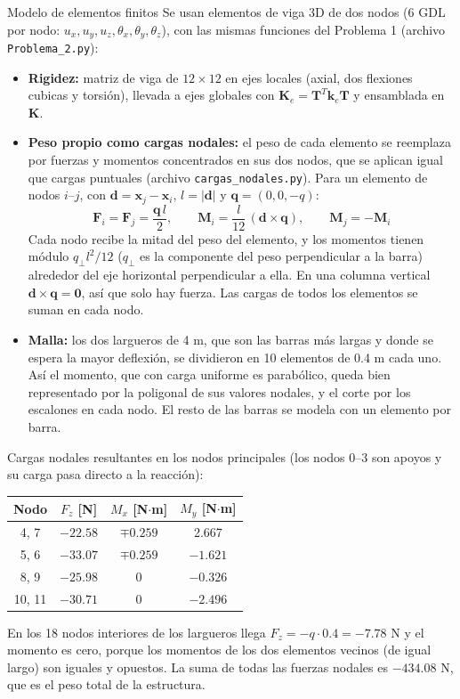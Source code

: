 \begin{desarrollo}{Modelo de elementos finitos}
Se usan elementos de viga 3D de dos nodos (6 GDL por nodo:
$u_x,u_y,u_z,\theta_x,\theta_y,\theta_z$), con las mismas funciones del
Problema 1 (archivo \texttt{Problema\_2.py}):
\begin{itemize}[itemsep=2pt]
    \item \textbf{Rigidez:} matriz de viga de $12\times12$ en ejes locales
    (axial, dos flexiones cubicas y torsión), llevada a ejes globales con
    $\mathbf{K}_e=\mathbf{T}^T\mathbf{k}_e\mathbf{T}$ y ensamblada en
    $\mathbf{K}$.
    \item \textbf{Peso propio como cargas nodales:} el peso de cada elemento
    se reemplaza por fuerzas y momentos concentrados en sus dos nodos, que se
    aplican igual que cargas puntuales (archivo \texttt{cargas\_nodales.py}).
    Para un elemento de nodos $i$--$j$, con $\mathbf{d}=\mathbf{x}_j-\mathbf{x}_i$,
    $l=|\mathbf{d}|$ y $\mathbf{q}=(0,0,-q)$:
    $$\mathbf{F}_i=\mathbf{F}_j=\frac{\mathbf{q}\,l}{2},\qquad
    \mathbf{M}_i=\frac{l}{12}\,(\mathbf{d}\times\mathbf{q}),\qquad
    \mathbf{M}_j=-\mathbf{M}_i$$
    Cada nodo recibe la mitad del peso del elemento, y los momentos tienen
    módulo $q_\perp l^2/12$ ($q_\perp$ es la componente del peso perpendicular
    a la barra) alrededor del eje horizontal perpendicular a ella. En una
    columna vertical $\mathbf{d}\times\mathbf{q}=\mathbf{0}$, así que solo hay
    fuerza. Las cargas de todos los elementos se suman en cada nodo.
    \item \textbf{Malla:} los dos largueros de 4 m, que son las barras más
    largas y donde se espera la mayor deflexión, se dividieron en 10 elementos
    de 0.4 m cada uno. Así el momento, que con carga uniforme es parabólico,
    queda bien representado por la poligonal de sus valores nodales, y el corte
    por los escalones en cada nodo. El resto de las barras se modela con un
    elemento por barra.
    
\end{itemize}

Cargas nodales resultantes en los nodos principales (los nodos 0--3 son
apoyos y su carga pasa directo a la reacción):
\begin{center}
\renewcommand{\arraystretch}{1.15}
\small
\begin{tabular}{cccc}
\hline
Nodo & $F_z$ [N] & $M_x$ [N$\cdot$m] & $M_y$ [N$\cdot$m]\\
\hline
4, 7   & $-22.58$ & $\mp0.259$ & 2.667\\
5, 6   & $-33.07$ & $\mp0.259$ & $-1.621$\\
8, 9   & $-25.98$ & 0 & $-0.326$\\
10, 11 & $-30.71$ & 0 & $-2.496$\\
\hline
\end{tabular}
\end{center}
En los 18 nodos interiores de los largueros llega $F_z=-q\cdot0.4=-7.78$ N y
el momento es cero, porque los momentos de los dos elementos vecinos (de igual
largo) son iguales y opuestos. La suma de todas las fuerzas nodales es
$-434.08$ N, que es el peso total de la estructura.


\end{desarrollo}
